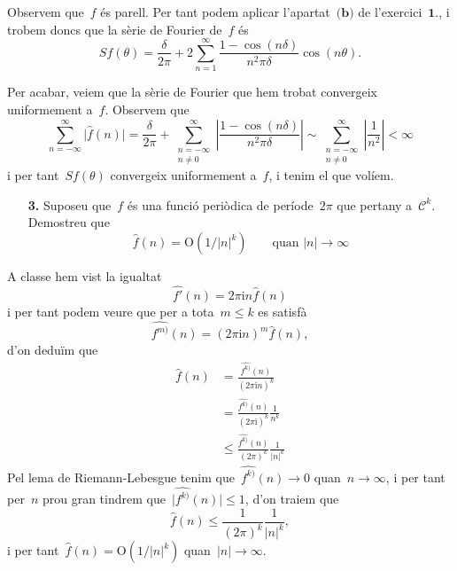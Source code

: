 \documentclass[a4paper]{article}
\newcommand{\iu}{\mathrm{i}}
\providecommand{\uppi}{\pi}
\newcommand{\abs}[1]{\lvert{#1}\rvert}
\newcommand{\Abs}[1]{\left\lvert{#1}\right\rvert}
\begin{document}
Observem que~\(f\) és parell. Per tant podem aplicar l'apartat~\(\textbf{(b)}\)
de l'exercici~\(\textbf{1.}\), i trobem doncs que la sèrie de Fourier de~\(f\)
és
\[
    Sf(\theta) = \frac{\delta}{2\uppi}
    + 2 \sum_{n = 1}^{\infty}
    \frac{1-\cos(n\delta)}{n^{2}\uppi\delta} \cos(n\theta).
\]

Per acabar, veiem que la sèrie de Fourier que hem trobat convergeix uniformement
a~\(f\). Observem que
\[
    \sum_{n=-\infty}^{\infty}\abs{\widehat{f}(n)}
    = \frac{\delta}{2\uppi} + \sum_{\substack{n=-\infty\\n\neq0}}^{\infty}
    \Abs{\frac{1 - \cos(n\delta)}{n^{2}\uppi\delta}}
    \sim \sum_{\substack{n=-\infty\\n\neq0}}^{\infty} \Abs{\frac{1}{n^{2}}}
    < \infty
\]
i per tant~\(Sf(\theta)\) convergeix uniformement a~\(f\), i tenim el que
volíem.

\clearpage
\begin{enumerate}
    \item[\textbf{3.}] Suposeu que~\(f\) és una funció periòdica de
        període~\(2\uppi\) que pertany a~\(\mathcal{C}^{k}\). Demostreu que
        \[
            \widehat{f}(n) = \mathrm{O}(1/\abs{n}^{k})
            \qquad\text{quan }
            \abs{n}\to\infty
        \]
\end{enumerate}
A classe hem vist la igualtat
\[
    \widehat{f'}(n) = 2\uppi\iu n\widehat{f}(n)
\]
i per tant podem veure que per a tota~\(m\leq k\) es satisfà
\[
    \widehat{f^{m)}}(n) = (2\uppi\iu n)^{m}\widehat{f}(n),
\]
d'on deduïm que
\begin{align*}
    \widehat{f}(n) &= \frac{\widehat{f^{k)}}(n)}{(2\uppi\iu n)^{k}} \\
                   &= \frac{\widehat{f^{k)}}(n)}{(2\uppi\iu)^{k}}
                      \frac{1}{n^{k}} \\
                   &\leq \frac{\widehat{f^{k)}}(n)}{(2\uppi)^{k}}
                      \frac{1}{\abs{n}^{k}}
\end{align*}
Pel lema de Riemann-Lebesgue tenim que~\(\widehat{f^{k)}}(n) \to 0\)
quan~\(n\to\infty\), i per tant per~\(n\) prou gran tindrem
que~\(\abs{\widehat{f^{k)}}(n)}\leq1\), d'on traiem que
\[
    \widehat{f}(n) \leq \frac{1}{(2\uppi)^{k}}\frac{1}{\abs{n}^{k}},
\]
i per tant~\(\widehat{f}(n) = \mathrm{O}(1/\abs{n}^{k})\)
quan~\(\abs{n}\to\infty\).
\end{document}
